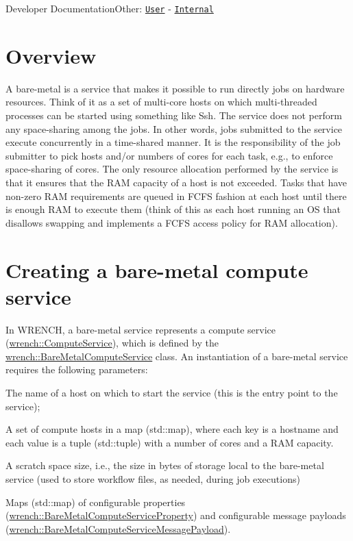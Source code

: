 Developer DocumentationOther\+: \href{../user/guide-baremetal.html}{\tt User} -\/ \href{../internal/guide-baremetal.html}{\tt Internal}\hypertarget{guide-baremetal_guide-baremetal-overview}{}\section{Overview}\label{guide-baremetal_guide-baremetal-overview}
A bare-\/metal is a service that makes it possible to run directly jobs on hardware resources. Think of it as a set of multi-\/core hosts on which multi-\/threaded processes can be started using something like Ssh. The service does not perform any space-\/sharing among the jobs. In other words, jobs submitted to the service execute concurrently in a time-\/shared manner. It is the responsibility of the job submitter to pick hosts and/or numbers of cores for each task, e.\+g., to enforce space-\/sharing of cores. The only resource allocation performed by the service is that it ensures that the R\+AM capacity of a host is not exceeded. Tasks that have non-\/zero R\+AM requirements are queued in F\+C\+FS fashion at each host until there is enough R\+AM to execute them (think of this as each host running an OS that disallows swapping and implements a F\+C\+FS access policy for R\+AM allocation).\hypertarget{guide-baremetal_guide-baremetal-creating}{}\section{Creating a bare-\/metal compute service}\label{guide-baremetal_guide-baremetal-creating}
In W\+R\+E\+N\+CH, a bare-\/metal service represents a compute service ({\ttfamily \hyperlink{classwrench_1_1_compute_service}{wrench\+::\+Compute\+Service}}), which is defined by the {\ttfamily \hyperlink{classwrench_1_1_bare_metal_compute_service}{wrench\+::\+Bare\+Metal\+Compute\+Service}} class. An instantiation of a bare-\/metal service requires the following parameters\+:


\begin{DoxyItemize}
\item The name of a host on which to start the service (this is the entry point to the service);
\item A set of compute hosts in a map ({\ttfamily std\+::map}), where each key is a hostname and each value is a tuple ({\ttfamily std\+::tuple}) with a number of cores and a R\+AM capacity.
\item A scratch space size, i.\+e., the size in bytes of storage local to the bare-\/metal service (used to store workflow files, as needed, during job executions)
\item Maps ({\ttfamily std\+::map}) of configurable properties ({\ttfamily \hyperlink{classwrench_1_1_bare_metal_compute_service_property}{wrench\+::\+Bare\+Metal\+Compute\+Service\+Property}}) and configurable message payloads ({\ttfamily \hyperlink{classwrench_1_1_bare_metal_compute_service_message_payload}{wrench\+::\+Bare\+Metal\+Compute\+Service\+Message\+Payload}}).
\end{DoxyItemize}

